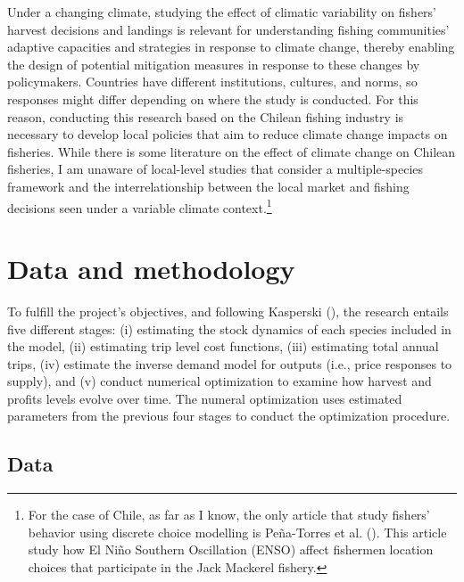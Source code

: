 \documentclass[
  11pt,
]{article}
\begin{document}
Under a changing climate, studying the effect of climatic variability on
fishers' harvest decisions and landings is relevant for understanding
fishing communities' adaptive capacities and strategies in response to
climate change, thereby enabling the design of potential mitigation
measures in response to these changes by policymakers. Countries have
different institutions, cultures, and norms, so responses might differ
depending on where the study is conducted. For this reason, conducting
this research based on the Chilean fishing industry is necessary to
develop local policies that aim to reduce climate change impacts on
fisheries. While there is some literature on the effect of climate
change on Chilean fisheries, I am unaware of local-level studies that
consider a multiple-species framework and the interrelationship between
the local market and fishing decisions seen under a variable climate
context.\footnote{For the case of Chile, as far as I know, the only
  article that study fishers' behavior using discrete choice modelling
  is Peña-Torres et al. (). This
  article study how El Niño Southern Oscillation (ENSO) affect fishermen
  location choices that participate in the Jack Mackerel fishery.}

\section{Data and methodology}\label{data-and-methodology}

To fulfill the project's objectives, and following Kasperski
(), the research entails five
different stages: (i) estimating the stock dynamics of each species
included in the model, (ii) estimating trip level cost functions, (iii)
estimating total annual trips, (iv) estimate the inverse demand model
for outputs (i.e., price responses to supply), and (v) conduct numerical
optimization to examine how harvest and profits levels evolve over time.
The numeral optimization uses estimated parameters from the previous
four stages to conduct the optimization procedure.

\subsection{Data}\label{data}
\end{document}

